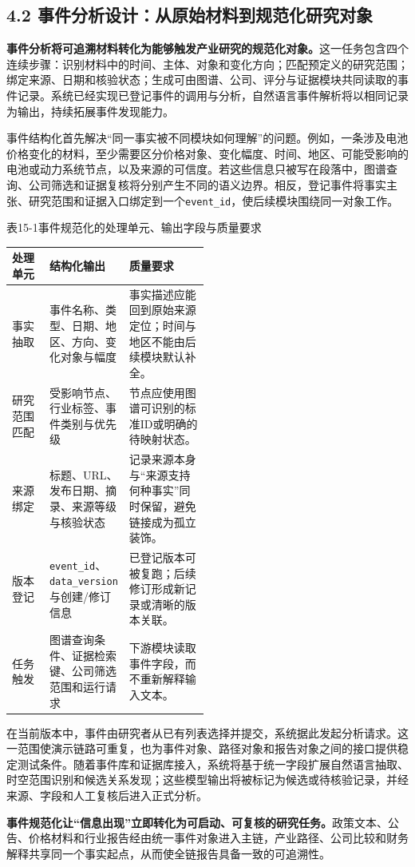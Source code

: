 \subsection*{4.2 事件分析设计：从原始材料到规范化研究对象}\label{page:15}
\noindent\textbf{事件分析将可追溯材料转化为能够触发产业研究的规范化对象。}这一任务包含四个连续步骤：识别材料中的时间、主体、对象和变化方向；匹配预定义的研究范围；绑定来源、日期和核验状态；生成可由图谱、公司、评分与证据模块共同读取的事件记录。系统已经实现已登记事件的调用与分析，自然语言事件解析将以相同记录为输出，持续拓展事件发现能力\cite{lhy-contracts,lhy-architecture}。

事件结构化首先解决“同一事实被不同模块如何理解”的问题。例如，一条涉及电池价格变化的材料，至少需要区分价格对象、变化幅度、时间、地区、可能受影响的电池或动力系统节点，以及来源的可信度。若这些信息只被写在段落中，图谱查询、公司筛选和证据复核将分别产生不同的语义边界。相反，登记事件将事实主张、研究范围和证据入口绑定到一个\texttt{event\_id}，使后续模块围绕同一对象工作。

\begin{center}\small 表15-1\quad 事件规范化的处理单元、输出字段与质量要求\par\vspace{1mm}
\begin{tabularx}{\linewidth}{p{0.19\linewidth}p{0.30\linewidth}X}
\toprule
处理单元 & 结构化输出 & 质量要求\\
\midrule
事实抽取 & 事件名称、类型、日期、地区、方向、变化对象与幅度 & 事实描述应能回到原始来源定位；时间与地区不能由后续模块默认补全。\\
研究范围匹配 & 受影响节点、行业标签、事件类别与优先级 & 节点应使用图谱可识别的标准ID或明确的待映射状态。\\
来源绑定 & 标题、URL、发布日期、摘录、来源等级与核验状态 & 记录来源本身与“来源支持何种事实”同时保留，避免链接成为孤立装饰。\\
版本登记 & \texttt{event\_id}、\texttt{data\_version}与创建/修订信息 & 已登记版本可被复跑；后续修订形成新记录或清晰的版本关联。\\
任务触发 & 图谱查询条件、证据检索键、公司筛选范围和运行请求 & 下游模块读取事件字段，而不重新解释输入文本。\\
\bottomrule
\end{tabularx}\end{center}

在当前版本中，事件由研究者从已有列表选择并提交，系统据此发起分析请求。这一范围使演示链路可重复，也为事件对象、路径对象和报告对象之间的接口提供稳定测试条件。随着事件库和证据库接入，系统将基于统一字段扩展自然语言抽取、时空范围识别和候选关系发现；这些模型输出将被标记为候选或待核验记录，并经来源、字段和人工复核后进入正式分析。

\noindent\textbf{事件规范化让“信息出现”立即转化为可启动、可复核的研究任务。}政策文本、公告、价格材料和行业报告经由统一事件对象进入主链，产业路径、公司比较和财务解释共享同一个事实起点，从而使全链报告具备一致的可追溯性。
